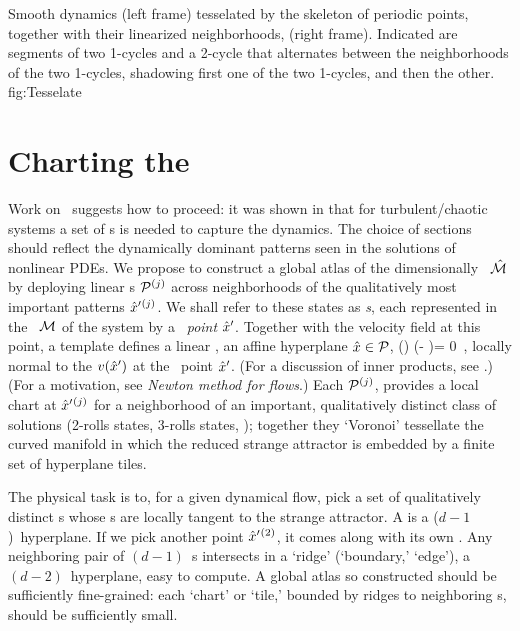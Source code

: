 {}{
Smooth dynamics  (left frame) tesselated by the skeleton of periodic
points, together with their linearized neighborhoods, (right frame).
Indicated are segments of two 1-cycles and a 2-cycle that alternates
between the neighborhoods of the two 1-cycles, shadowing first one of the
two 1-cycles, and then the other.
}{fig:Tesselate} %
%
%


\section{Charting the \statesp}
	\label{sec:chart}

Work on \KS\ suggests how to proceed: it was shown in
 that for turbulent/chaotic systems a set of
{\PoincSec s} is needed to capture the dynamics. The choice of
sections should reflect the dynamically dominant patterns seen in the
solutions of nonlinear PDEs. We propose to construct a global atlas of
the dimensionally \reducedsp\ $\hat{\mathcal{M}}$ by deploying linear {\PoincSec s} $\mathcal{P}{}^{(j)}$ across neighborhoods of the qualitatively most important
patterns ${\hat{x}'}{}^{(j)}$.
We shall refer to these states as \emph{\template s}, each
represented in the \statesp\ $\mathcal{M}$ of the system by
a \emph{\template\ point} ${\hat{x}'}$. Together with the velocity
field at this point, a template defines a linear {\PoincSec},
an affine hyperplane $\hat{x} \in \mathcal{P}$,
\beq
    \vel(\slicep) \cdot (\sspRed - \slicep)= 0
\,,
locally normal to the $v({\hat{x}'})$ at the \template\ point ${\hat{x}'}$.
(For a discussion of inner products, see
.)
(For a motivation, see
 \emph{Newton method for flows}.)
Each {\PoincSec} $\mathcal{P}{}^{(j)}$, provides a local chart
at ${\hat{x}'}{}^{(j)}$ for a
neighborhood of an important, qualitatively distinct class of solutions
(2-rolls states, 3-rolls states, \etc); together they `Voronoi'
tessellate  the curved manifold in which the reduced strange attractor is
embedded by a finite set of hyperplane
tiles.

The physical task is to, for a given dynamical flow, pick a set of
qualitatively distinct {\template s} whose {\PoincSec s} are locally tangent
to the strange attractor.
A {\PoincSec} is a
($d\!-\!1$)\dmn\ hyperplane. If we pick another {\template} point
${\hat{x}'}{}^{(2)}$, it comes along with its own {\PoincSec}. Any
neighboring pair of $(d\!-\!1)$\dmn\ {\PoincSec s} intersects in a `ridge'
(`boundary,' `edge'), a $(d\!-\!2)$\dmn\ hyperplane, easy to compute.
A global atlas so constructed should be sufficiently
fine-grained: each `chart' or `tile,' bounded by ridges to
neighboring {\PoincSec s}, should be sufficiently small.

